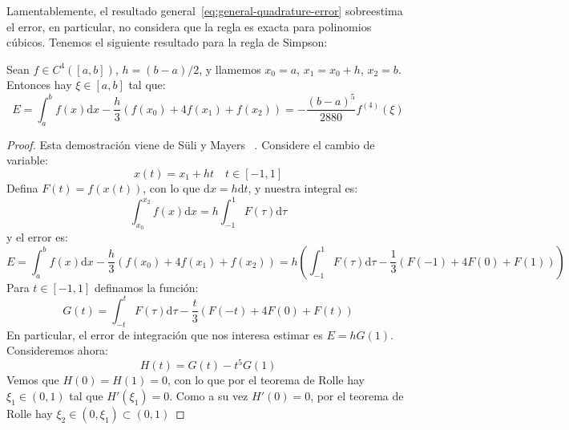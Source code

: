   Lamentablemente,
  el resultado general~\eqref{eq:general-quadrature-error}
  sobreestima el error,
  en particular,
  no considera que la regla es exacta para polinomios cúbicos.
  Tenemos el siguiente resultado para la regla de Simpson:
  \begin{theorem}
    Sean \(f \in C^4([a, b])\),
    \(h = (b - a) / 2\),
    y llamemos \(x_0 = a\), \(x_1 = x_0 + h\), \(x_2 = b\).
    Entonces hay \(\xi \in [a, b]\) tal que:
    \begin{equation*}
      E
        = \int_a^b f(x) \mathrm{d} x
            - \frac{h}{3} (f(x_0) + 4 f(x_1) + f(x_2))
        = - \frac{(b - a)^5}{2880} f^{(4)}(\xi)
    \end{equation*}
  \end{theorem}
  \begin{proof}
    Esta demostración viene de Süli y Mayers~%
      \cite[capítulo 7]{sueli03:_intro_numerical_analysis}.
    Considere el cambio de variable:
    \begin{equation*}
      x(t)
        = x_1 + h t
        \quad t \in [-1, 1]
    \end{equation*}
    Defina \(F(t) = f(x(t))\),
    con lo que \(\mathrm{d} x = h \mathrm{d} t\),
    y nuestra integral es:
    \begin{equation*}
      \int_{x_0}^{x_2} f(x) \mathrm{d} x
        = h \int_{-1}^1 F(\tau) \mathrm{d} \tau
    \end{equation*}
    y el error es:
    \begin{equation*}
      E
        = \int_a^b f(x) \mathrm{d} x
            -  \frac{h}{3} (f(x_0) + 4 f(x_1) + f(x_2))
        = h \left(
              \int_{-1}^1 F(\tau) \mathrm{d} \tau
                - \frac{1}{3} (F(-1) + 4 F(0) + F(1))
            \right)
    \end{equation*}
    Para \(t \in [-1, 1]\) definamos la función:
    \begin{equation*}
      G(t)
        = \int_{-t}^t F(\tau) \mathrm{d} \tau
                - \frac{t}{3} (F(-t) + 4 F(0) + F(t))
    \end{equation*}
    En particular,
    el error de integración que nos interesa estimar es \(E = h G(1)\).
    Consideremos ahora:
    \begin{equation*}
      H(t)
        = G(t) - t^5 G(1)
    \end{equation*}
    Vemos que \(H(0) = H(1) = 0\),
    con lo que por el teorema de Rolle hay \(\xi_1 \in (0, 1)\)
    tal que \(H'(\xi_1) = 0\).
    Como a su vez \(H'(0) = 0\),
    por el teorema de Rolle hay \(\xi_2 \in (0, \xi_1) \subset (0, 1)\)

\end{proof}
